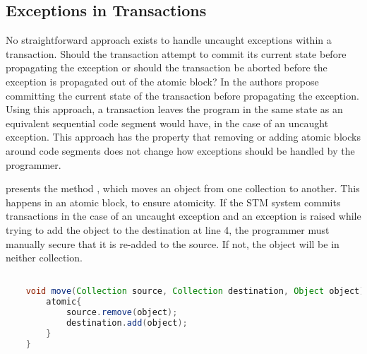 \subsection{Exceptions in Transactions}
\label{subsec:stm:side_effects}
No straightforward approach exists to handle uncaught exceptions within a transaction\cite[p. 80]{harris2010transactional}. Should the transaction attempt to commit its current state before propagating the exception or should the transaction be aborted before the exception is propagated out of the atomic block? In \cite{harris2003language} the authors propose committing the current state of the transaction before propagating the exception. Using this approach, a transaction leaves the program in the same state as an equivalent sequential code segment would have, in the case of an uncaught exception. This approach has the property that removing or adding atomic blocks around code segments does not change how exceptions should be handled by the programmer\cite[p. 79]{harris2010transactional}.

 presents the method , which moves an object from one collection to another. This happens in an atomic block, to ensure atomicity. If the \ac{STM} system commits transactions in the case of an uncaught exception and an exception is raised while trying to add the object to the destination at line 4, the programmer must manually secure that it is re-added to the source. If not, the object will be in neither collection.

\begin{lstlisting}[label=lst:stm_exception,
  caption={Exceptions in Transaction},
  language=Java,  
  showspaces=false,
  showtabs=false,
  breaklines=true,
  showstringspaces=false,
  breakatwhitespace=true,
  commentstyle=\color{greencomments},
  keywordstyle=\color{bluekeywords},
  stringstyle=\color{redstrings},
  morekeywords={atomic, retry, orElse}]  % Start your code-block

	void move(Collection source, Collection destination, Object object){
		atomic{
			source.remove(object);
			destination.add(object);
		}
	}      
\end{lstlisting}

